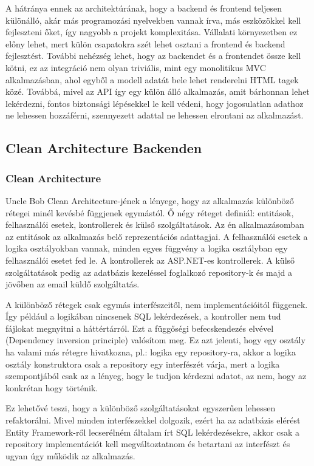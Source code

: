 A hátránya ennek az architektúrának, hogy a backend és frontend teljesen különálló, akár más programozási nyelvekben vannak írva, más eszközökkel kell fejleszteni őket, így nagyobb a projekt komplexitása. Vállalati környezetben ez előny lehet, mert külön csapatokra szét lehet osztani a frontend és backend fejlesztést. További nehézség lehet, hogy az backendet és a frontendet össze kell kötni, ez az integráció nem olyan triviális, mint egy monolitikus MVC alkalmazásban, ahol egyből a modell adatát bele lehet renderelni HTML tagek közé. Továbbá, mivel az API így egy külön álló alkalmazás, amit bárhonnan lehet lekérdezni, fontos biztonsági lépésekkel le kell védeni, hogy jogosulatlan adathoz ne lehessen hozzáférni, szennyezett adattal ne lehessen elrontani az alkalmazást.

\subsection{Clean Architecture Backenden}
\subsubsection{Clean Architecture}
Uncle Bob Clean Architecture\cite{cleanArchitecturePost}-jének a lényege, hogy az alkalmazás különböző rétegei minél kevésbé függjenek egymástól. Ő négy réteget definiál: entitások, felhasználói esetek, kontrollerek és külső szolgáltatások. Az én alkalmazásomban az entitások az alkalmazás belő reprezentációs adattagjai. A felhasználói esetek a logika osztályokban vannak, minden egyes függvény a logika osztályban egy felhasználói esetet fed le. A kontrollerek az ASP.NET-es kontrollerek. A külső szolgáltatások pedig az adatbázis kezeléssel foglalkozó repository-k és majd a jövőben az email küldő szolgáltatás.

A különböző rétegek csak egymás interfészeitől, nem implementációitól függenek. Így például a logikában nincsenek SQL lekérdezések, a kontroller nem tud fájlokat megnyitni a háttértárról. Ezt a függőségi befecskendezés elvével (Dependency inversion principle) valósítom meg. Ez azt jelenti, hogy egy osztály ha valami más rétegre hivatkozna, pl.: logika egy repository-ra, akkor a logika osztály konstruktora csak a repository egy interfészét várja, mert a logika szempontjából csak az a lényeg, hogy le tudjon kérdezni adatot, az nem, hogy az konkrétan hogy történik.

Ez lehetővé teszi, hogy a különböző szolgáltatásokat egyszerűen lehessen refaktorálni. Mivel minden interfészekkel dolgozik, ezért ha az adatbázis elérést Entity Framework-ről lecserélném általam írt SQL lekérdezésekre, akkor csak a repository implementációt kell megváltoztatnom és betartani az interfészt és ugyan úgy működik az alkalmazás.

